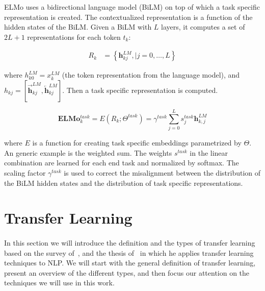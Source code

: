 ELMo uses a bidirectional language model (BiLM) on top of which a task specific representation is created. The contextualized representation is a function of the hidden states of the BiLM. Given a BiLM with $L$ layers, it computes a set of $2L+1$ representations for each token $t_k$:

\begin{equation}
\begin{split}
R_{k} & =\left\{\mathbf{h}_{kj}^{LM},| j=0, \ldots, L\right\}    
\end{split}
\end{equation}
 

where $h_{k0}^{LM} = x_k^{LM}$ (the token representation from the language model), and $h_{kj} = [\overrightarrow{\mathbf{h}}_{k j}^{LM}, \overleftarrow{\mathbf{h}}_{k j}^{L M}]$. Then a task specific representation is computed.

\begin{equation}
\mathbf{E} \mathbf{L} \mathbf{M} \mathbf{o}_{k}^{task}=E\left(R_{k} ; \Theta^{task}\right)=\gamma^{t a s k} \sum_{j=0}^{L} s_{j}^{task} \mathbf{h}_{k, j}^{LM}
\end{equation}

where  $E$ is a function for creating task specific embeddings parametrized by $\Theta$. An generic example is the weighted sum. The weights $s^{task}$ in the linear combination are learned for each end task and normalized by softmax. The scaling factor $\gamma^{task}$ is used to correct the misalignment between the distribution of the BiLM hidden states and the distribution of task specific representations.



\section{Transfer Learning}
\label{sec:transfer_learning}

\paragraph{}
In this section we will introduce the definition and the types of transfer learning based on the survey of~\cite{pan2010transfer}, and the thesis of~\cite{ruder2019neural} in which he applies transfer learning techniques to NLP. We will start with the general definition of transfer learning, present an overview of the different types, and then focus our attention on the techniques we will use in this work. 


